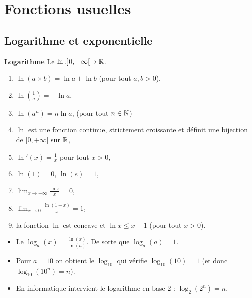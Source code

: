 \documentclass[10pt,class=article,crop=false]{standalone}
\begin{document}
\section{Fonctions usuelles}

\begin{multicols}{2}
	

\subsection{Logarithme et exponentielle}


\textbf{Logarithme}
\sauteligne
Le  $\ln : ]0,+\infty[ \to \mathbb{R}$.
\begin{proposition}
\begin{enumerate}
	\item $\ln (a \times b) = \ln a + \ln b$ (pour tout $a,b >0$),
	\item $\ln(\frac 1 a) = - \ln a$,
	\item $\ln(a^n) = n \ln a$, (pour tout $n \in \mathbb{N}$)
	\item $\ln$ est une fonction continue, strictement croissante et définit une bijection de
	$]0,+\infty[$ sur $\mathbb{R}$,
	\item $\ln'(x) = \frac 1x$ pour tout $x>0$,
	\item $\ln(1) = 0$, $\ln(e)=1$,
	\item $\lim_{x\to +\infty} \frac{\ln x}{x} = 0$,
	\item $\lim_{x\to0}\frac{\ln(1+x)}{x} = 1$,
	\item la fonction $\ln$ est concave et $\ln x \le x-1$ (pour tout $x>0$).
\end{enumerate}
\end{proposition}


\begin{itemize}
	\item Le  
	$\log_a(x) = \frac{\ln(x)}{\ln(a)}$.
	De sorte que $\log_a(a)=1$.
	
	\item Pour $a=10$ on obtient le  $\log_{10}$ qui vérifie
	$\log_{10} (10)=1$ (et donc $\log_{10}(10^n)=n$).
	
	\item En informatique intervient le logarithme en base $2$ : $\log_2(2^n)=n$.
\end{itemize}





\end{multicols}
\end{document}
